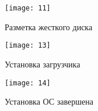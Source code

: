 \begin{figure}[ht]
    \centering
	\texttt{[image: 11]}
	\caption{Разметка жесткого диска}
\end{figure}

\begin{figure}[ht]
    \centering
	\texttt{[image: 13]}
	\caption{Установка загрузчика}
\end{figure}

\begin{figure}[ht]
    \centering
	\texttt{[image: 14]}
	\caption{Установка ОС завершена}
\end{figure}

\clearpage

